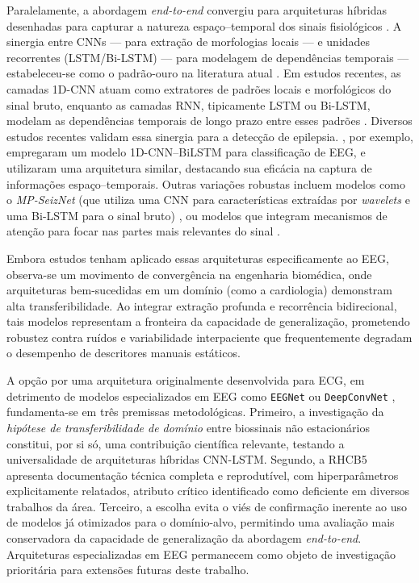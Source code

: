 \documentclass[alpha-refs,brazilian]{CC-EC_TF-TC}
\begin{document}
Paralelamente, a abordagem \textit{end-to-end} convergiu para arquiteturas híbridas desenhadas para capturar a natureza espaço--temporal dos sinais fisiológicos \citep{Roy2019Deep, Shoeibi2021}. A sinergia entre CNNs — para extração de morfologias locais — e unidades recorrentes (LSTM/Bi-LSTM) — para modelagem de dependências temporais — estabeleceu-se como o padrão-ouro na literatura atual \citep{Zhang2024Review}. Em estudos recentes, as camadas 1D-CNN atuam como extratores de padrões locais e morfológicos do sinal bruto, enquanto as camadas RNN, tipicamente LSTM ou Bi-LSTM, modelam as dependências temporais de longo prazo entre esses padrões \citep{Lu2019Residual}. Diversos estudos recentes validam essa sinergia para a detecção de epilepsia. \cite{Wang2024}, por exemplo, empregaram um modelo 1D-CNN–BiLSTM para classificação de EEG, e \cite{Khan2023} utilizaram uma arquitetura similar, destacando sua eficácia na captura de informações espaço--temporais. Outras variações robustas incluem modelos como o \textit{MP-SeizNet} (que utiliza uma CNN para características extraídas por \textit{wavelets} e uma Bi-LSTM para o sinal bruto) \citep{Wang2024}, ou modelos que integram mecanismos de atenção para focar nas partes mais relevantes do sinal \citep{Guhdar2025Hybrid}.

Embora estudos tenham aplicado essas arquiteturas especificamente ao EEG, observa-se um movimento de convergência na engenharia biomédica, onde arquiteturas bem-sucedidas em um domínio (como a cardiologia) demonstram alta transferibilidade. Ao integrar extração profunda e recorrência bidirecional, tais modelos representam a fronteira da capacidade de generalização, prometendo robustez contra ruídos e variabilidade interpaciente que frequentemente degradam o desempenho de descritores manuais estáticos.

A opção por uma arquitetura originalmente desenvolvida para ECG, em detrimento de modelos especializados em EEG como \texttt{EEGNet} \citep{Lawhern2018} ou \texttt{DeepConvNet} \citep{Schirrmeister2017}, fundamenta-se em três premissas metodológicas. Primeiro, a investigação da \textit{hipótese de transferibilidade de domínio} entre biossinais não estacionários constitui, por si só, uma contribuição científica relevante, testando a universalidade de arquiteturas híbridas CNN-LSTM. Segundo, a RHCB5 apresenta documentação técnica completa e reprodutível, com hiperparâmetros explicitamente relatados, atributo crítico identificado como deficiente em diversos trabalhos da área. Terceiro, a escolha evita o viés de confirmação inerente ao uso de modelos já otimizados para o domínio-alvo, permitindo uma avaliação mais conservadora da capacidade de generalização da abordagem \textit{end-to-end}. Arquiteturas especializadas em EEG permanecem como objeto de investigação prioritária para extensões futuras deste trabalho.
\end{document}
